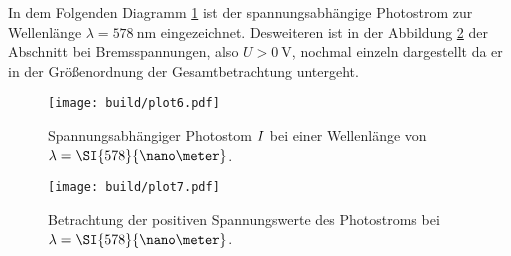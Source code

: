 In dem Folgenden Diagramm \ref{fig:1} ist der spannungsabhängige Photostrom zur Wellenlänge $\lambda = \SI{578}{\nano\meter}$ eingezeichnet. Desweiteren ist in der Abbildung \ref{fig:2} der Abschnitt bei Bremsspannungen, also $U > \SI{0}{\volt}$, nochmal einzeln dargestellt
da er in der Größenordnung der Gesamtbetrachtung untergeht.

\begin{figure}
    \centering
    \texttt{[image: build/plot6.pdf]}
    \caption{Spannungsabhängiger Photostom $\protect I$ bei einer Wellenlänge von $\protect \lambda = \SI{578}{\nano\meter}$.} 
    \label{fig:1}
\end{figure}

\begin{figure}
    \centering
    \texttt{[image: build/plot7.pdf]}
    \caption{Betrachtung der positiven Spannungswerte des Photostroms bei $\protect \lambda = \SI{578}{\nano\meter}$. } 
    \label{fig:2}
\end{figure}

